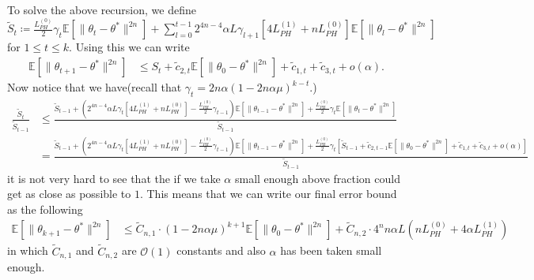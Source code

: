 \documentclass[a4paper]{article}
\newcommand{\norm}[1]{\|#1 \|}
\newcommand{\Exs}{\mathbb{E}}
\newcommand{\thetastar}{\theta^*}
\newcommand{\constLPH}[1]{L_{PH}^{(#1)}}
\newcommand{\stepsize}{\alpha}
\begin{document}
	To solve the above recursion, we define $\tilde{S}_{t} \coloneq \frac{\constLPH{0}}{2}\gamma_{t}\Exs\left[\norm{\theta_{t} - \thetastar}^{2n}\right] + \sum_{l = 0}^{t - 1}2^{4n - 4}\stepsize L \gamma_{l + 1}\left[4\constLPH{1} + n\constLPH{0}\right]\Exs\left[\norm{\theta_{l} - \thetastar}^{2n}\right]$ for $1 \leq t \leq k$. Using this we can write
	\begin{align*}
		\Exs\left[\norm{\theta_{t + 1} - \thetastar}^{2n}\right] & \leq S_{t} + \tilde{c}_{2, t}\Exs\left[\norm{\theta_{0} - \thetastar}^{2n}\right] + \tilde{c}_{1, t} + \tilde{c}_{3, t} + o\left(\stepsize\right).
	\end{align*}
	Now notice that we have(recall that $\gamma_{t} = 2n\stepsize\left(1 - 2n\stepsize\mu\right)^{k - t}$.)
	\begin{align*}
		\frac{\tilde{S}_{t}}{\tilde{S}_{t - 1}} &‌ \leq \frac{\tilde{S}_{t - 1} + \left(2^{4n - 4}\stepsize L \gamma_{t}\left[4\constLPH{1} + n\constLPH{0}\right] - \frac{\constLPH{0}}{2}\gamma_{t - 1}\right)\Exs\left[\norm{\theta_{t - 1} - \thetastar}^{2n}\right] + \frac{\constLPH{0}}{2}\gamma_{t}\Exs\left[\norm{\theta_{t} - \thetastar}^{2n}\right]}{\tilde{S}_{t - 1}}\\
		& = \frac{\tilde{S}_{t - 1} + \left(2^{4n - 4}\stepsize L \gamma_{t}\left[4\constLPH{1} + n\constLPH{0}\right] - \frac{\constLPH{0}}{2}\gamma_{t - 1}\right)\Exs\left[\norm{\theta_{t - 1} - \thetastar}^{2n}\right] + \frac{\constLPH{0}}{2}\gamma_{t}\left[\tilde{S}_{t - 1} + \tilde{c}_{2, t - 1}\Exs\left[\norm{\theta_{0} - \thetastar}^{2n}\right] + \tilde{c}_{1, t} + \tilde{c}_{3, t} + o\left(\stepsize\right)\right]}{\tilde{S}_{t - 1}}
	\end{align*}
	it is not very hard to see that the if we take $\stepsize$ small enough above fraction could get as close as possible to $1$. This means that we can write our final error bound as the following
	\begin{align*}
		\Exs\left[\norm{\theta_{k +‌ 1} - \thetastar}^{2n}\right] & \leq \tilde{C}_{n, 1} \cdot \left(1 - 2n\stepsize\mu\right)^{k + 1}\Exs\left[\norm{\theta_{0} - \thetastar}^{2n}\right] + \tilde{C}_{n, 2} \cdot 4^{n}n\stepsize L\left(n\constLPH{0} + 4\stepsize \constLPH{1}\right)
	\end{align*}
	in which $\tilde{C}_{n, 1}$ and $\tilde{C}_{n, 2}$ are $\mathcal{O}(1)$ constants and also $\stepsize$ has been taken small enough.
	 
	
	
	
\end{document}
